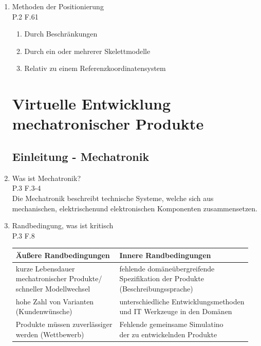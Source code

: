 \documentclass[10pt,a4paper,fleqn]{article}
\begin{document}
\begin{enumerate}
\begin{center}
		\end{center}		
	\item Methoden der Positionierung\\
		P.2 F.61
		\begin{enumerate}
			\item Durch Beschränkungen
			\item Durch ein oder mehrerer Skelettmodelle
			\item Relativ zu einem Referenzkoordinatensystem
		\end{enumerate}
\pagebreak
\section{Virtuelle Entwicklung mechatronischer Produkte}
\subsection{Einleitung - Mechatronik}
	\item Was ist Mechatronik?\\
		P.3 F.3-4\\
		Die Mechatronik beschreibt technische Systeme, welche sich aus mechanischen, elektrischenund elektronischen Komponenten zusammensetzen.
	\item Randbedingung, was ist kritisch\\
		P.3 F.8\\
			\begin{center}
				\begin{tabular}{|l|l|}
					\hline 
					Äußere Randbedingungen & Innere Randbedingungen \\ 
					\hline 
					\pbox{20cm}{kurze Lebensdauer \\ mechatronischer Produkte/ \\ schneller Modellwechsel} & \pbox{20cm}{fehlende domäneübergreifende \\ Spezifikation der Produkte \\ (Beschreibungssprache)} \\ 
					\hline 
					\pbox{20cm}{hohe Zahl von Varianten \\ (Kundenwünsche) } & \pbox{20cm}{unterschiedliche Entwicklungsmethoden \\ und IT Werkzeuge in den Domänen  } \\ 
					\hline 
					\pbox{20cm}{Produkte müssen zuverlässiger \\ werden (Wettbewerb) } & \pbox{20cm}{ Fehlende gemeinsame Simulatino \\ der zu entwickelnden Produkte } \\ 

\end{tabular}
\end{center}
\end{enumerate}
\end{document}
